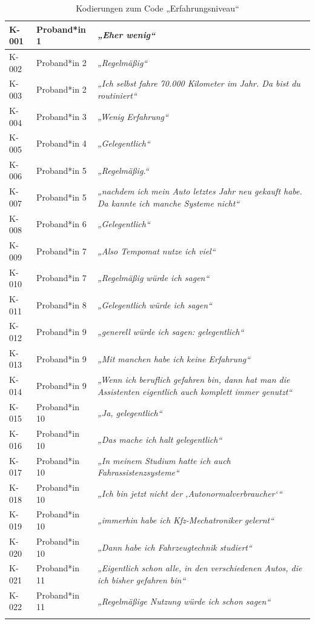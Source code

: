 {\begin{xltabular}{\textwidth}{
    |P{0.10\textwidth}
    |P{0.17\textwidth}
    |Y|
}
K-001 & Proband*in 1 & \textit{„Eher wenig“} \\
\hline
K-002 & Proband*in 2 & \textit{„Regelmäßig“} \\
\hline
K-003 & Proband*in 2 & \textit{„Ich selbst fahre 70.000 Kilometer im Jahr. Da bist du routiniert“} \\
\hline
K-004 & Proband*in 3 & \textit{„Wenig Erfahrung“} \\
\hline
K-005 & Proband*in 4 & \textit{„Gelegentlich“} \\
\hline
K-006 & Proband*in 5 & \textit{„Regelmäßig.“} \\
\hline
K-007 & Proband*in 5 & \textit{„nachdem ich mein Auto letztes Jahr neu gekauft habe. Da kannte ich manche Systeme nicht“} \\
\hline
K-008 & Proband*in 6 & \textit{„Gelegentlich“} \\
\hline
K-009 & Proband*in 7 & \textit{„Also Tempomat nutze ich viel“} \\
\hline
K-010 & Proband*in 7 & \textit{„Regelmäßig würde ich sagen“} \\
\hline
K-011 & Proband*in 8 & \textit{„Gelegentlich würde ich sagen“} \\
\hline
K-012 & Proband*in 9 & \textit{„generell würde ich sagen: gelegentlich“} \\
\hline
K-013 & Proband*in 9 & \textit{„Mit manchen habe ich keine Erfahrung“} \\
\hline
K-014 & Proband*in 9 & \textit{„Wenn ich beruflich gefahren bin, dann hat man die Assistenten eigentlich auch komplett immer genutzt“} \\
\hline
K-015 & Proband*in 10 & \textit{„Ja, gelegentlich“} \\
\hline
K-016 & Proband*in 10 & \textit{„Das mache ich halt gelegentlich“} \\
\hline
K-017 & Proband*in 10 & \textit{„In meinem Studium hatte ich auch Fahrassistenzsysteme“} \\
\hline
K-018 & Proband*in 10 & \textit{„Ich bin jetzt nicht der ‚Autonormalverbraucher‘“} \\
\hline
K-019 & Proband*in 10 & \textit{„immerhin habe ich Kfz-Mechatroniker gelernt“} \\
\hline
K-020 & Proband*in 10 & \textit{„Dann habe ich Fahrzeugtechnik studiert“} \\
\hline
K-021 & Proband*in 11 & \textit{„Eigentlich schon alle, in den verschiedenen Autos, die ich bisher gefahren bin“} \\
\hline
K-022 & Proband*in 11 & \textit{„Regelmäßige Nutzung würde ich schon sagen“} \\
\hline
\caption{Kodierungen zum Code „Erfahrungsniveau“}\label{tab:kodiernachweis-erfahrungsniveau}\\
\end{xltabular}
}

